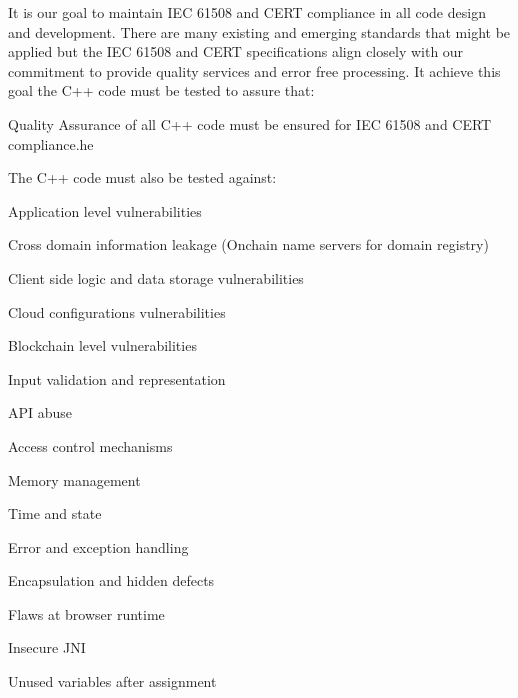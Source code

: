 \documentclass[11pt]{article}
\begin{document}
It is our goal to maintain IEC 61508 and CERT compliance in all code design and development. There are many existing and emerging standards that might be applied but the IEC 61508 and CERT specifications align closely with our commitment to provide quality services and error free processing. It achieve this goal the C++ code must be tested to assure that:


Quality Assurance of all C++ code must be ensured for IEC 61508 and CERT compliance.he


The C++ code must also be tested against:


Application level vulnerabilities


Cross domain information leakage (Onchain name servers for domain registry)


Client side logic and data storage vulnerabilities


Cloud configurations vulnerabilities


Blockchain level vulnerabilities


Input validation and representation


API abuse


Access control mechanisms


Memory management


Time and state


Error and exception handling


Encapsulation and hidden defects


Flaws at browser runtime


Insecure JNI


Unused variables after assignment
\end{document}
